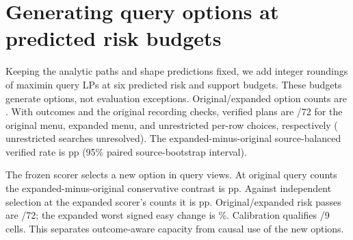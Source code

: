 \section{Generating query options at predicted risk budgets}
Keeping the analytic paths and shape predictions fixed, we add
integer roundings of maximin query LPs at six predicted risk and
support budgets. These budgets generate options, not evaluation
exceptions. Original/expanded option counts are
\RiskFrontierOptions{}. With outcomes and the original recording
checks, verified plans are \RiskFrontierVerified{}/72 for the original
menu, expanded menu, and unrestricted per-row choices, respectively
(\RiskFrontierUnresolved{} unrestricted searches unresolved).
The expanded-minus-original source-balanced verified rate is
\RiskFrontierCoverage{} pp (95\% paired source-bootstrap interval).

The frozen scorer selects a new option in \RiskFrontierNew{} query
views. At original query counts the expanded-minus-original
conservative contrast is \RiskFrontierCount{} pp. Against independent
selection at the expanded scorer's counts it is \RiskFrontierJoint{}
pp. Original/expanded risk passes are \RiskFrontierPasses{}/72;
the expanded worst signed easy change is \RiskFrontierWorst{}\%.
Calibration qualifies \RiskFrontierQual{}/9 cells. This separates
outcome-aware capacity from causal use of the new options.
